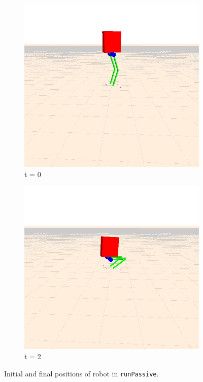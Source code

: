 \documentclass[letterpaper, 10 pt, conference]{ieeeconf}  %
\begin{document}
   \begin{figure}[thpb]
      \begin{subfigure}[b]{\linewidth}
        \includegraphics[width=\linewidth]{figures/runPassiveInitial.jpg}
        \caption{t = 0}
        \label{runPassiveInit}
      \end{subfigure}
      \begin{subfigure}[b]{\linewidth}
        \includegraphics[width=\linewidth]{figures/runPassiveFinal.jpg}
        \caption{t = 2}
        \label{runPassiveFinal}
      \end{subfigure}
      \caption{Initial and final positions of robot in {\tt runPassive}.}
      \label{footstep}
   \end{figure}
\end{document}
